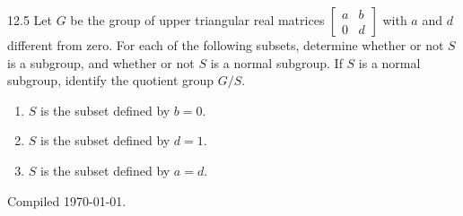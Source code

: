 \documentclass[11pt]{article}
\begin{document}
\begin{exercise}{12.5}
Let $G$ be the group of upper triangular real matrices
$\begin{bmatrix}a&b\\0&d\end{bmatrix}$ with $a$ and $d$ different from
zero. For each of the following subsets, determine whether or not $S$ is
a subgroup, and whether or not $S$ is a normal subgroup. If $S$ is a
normal subgroup, identify the quotient group $G/S$.
\begin{enumerate}[label=\textbf{(\roman*)}]
  \item $S$ is the subset defined by $b=0$.
  \item $S$ is the subset defined by $d=1$.
  \item $S$ is the subset defined by $a=d$.
\end{enumerate}
\end{exercise}

\vfill
{\small\color{darkgray}Compiled \today.}
\end{document}

